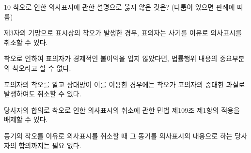 \begin{question}{10}
착오로 인한 의사표시에 관한 설명으로 옳지 않은 것은? (다툼이 있으면 판례에 따름)
\begin{choices}
  \item 제3자의 기망으로 표시상의 착오가 발생한 경우, 표의자는 사기를 이유로 의사표시를 취소할 수 있다.
  \item 착오로 인하여 표의자가 경제적인 불이익을 입지 않았다면, 법률행위 내용의 중요부분의 착오라고 할 수 없다.
  \item 표의자의 착오를 알고 상대방이 이를 이용한 경우에는 착오가 표의자의 중대한 과실로 발생하여도 취소할 수 있다.
  \item 당사자의 합의로 착오로 인한 의사표시의 취소에 관한 민법 제109조 제1항의 적용을 배제할 수 있다.
  \item 동기의 착오를 이유로 의사표시를 취소할 때 그 동기를 의사표시의 내용으로 하는 당사자의 합의까지는 필요 없다.
\end{choices}
\end{question}
